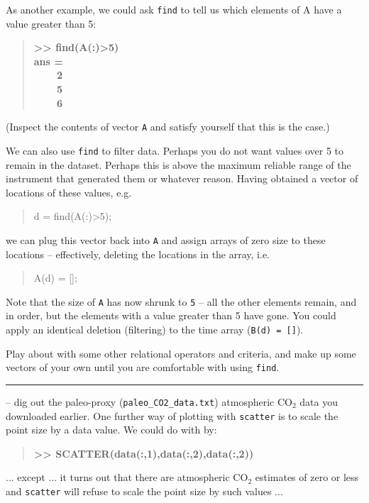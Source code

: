 \documentclass{tufte-book} %
\newenvironment{docspec}{\begin{quotation}\ttfamily\parskip0pt\parindent0pt\ignorespaces}{\end{quotation}}
\newenvironment{docspecbold}{\begin{quotation}\ttfamily\bfseries\parskip0pt\parindent0pt\ignorespaces}{\end{quotation}}
\begin{document}
As another example, we could ask \texttt{find} to tell us which elements of A have a value greater than 5:
\begin{docspecbold}
>> find(A(:)>5)
\\ ans =
\\ \ \ \ \ 2
\\ \ \ \ \ 5
\\ \ \ \ \ 6
\end{docspecbold}
(Inspect the contents of vector \texttt{A} and satisfy yourself that this is the case.)

We can also use \texttt{find} to filter data. Perhaps you do not want values over 5 to remain in the dataset. Perhaps this is above the maximum reliable range of the instrument that generated them or whatever reason. Having obtained a vector of locations of these values, e.g.
\begin{docspec}
d = find(A(:)>5);
\end{docspec}
we can plug this vector back into \texttt{A} and assign arrays of zero size to these locations -- effectively, deleting the locations in the array, i.e.
\begin{docspec}
A(d) = [];
\end{docspec}
Note that the size of \texttt{A} has now shrunk to \texttt{5} -- all the other elements remain, and in order, but the elements with a value greater than 5 have gone. You could apply an identical deletion (filtering) to the time array (\texttt{B(d) = []}).

Play about with some other relational operators and criteria, and make up some vectors of your own until you are comfortable with using \texttt{find}. 

\vspace{1mm}
\noindent\rule{4cm}{0.5pt}
\vspace{-2mm}


 -- dig out the paleo-proxy (\texttt{paleo\_CO2\_data.txt}) atmospheric CO\(_{2}\) data you downloaded earlier. One further way of plotting with \texttt{scatter} is to scale the point size by a data value. We could do with by:
\begin{docspecbold}
>> SCATTER(data(:,1),data(:,2),data(:,2))
\end{docspecbold}
... except ... it turns out that there are atmospheric CO\(_{2}\) estimates of zero or less   and \texttt{scatter} will refuse to scale the point size by such values ...
\end{document}
